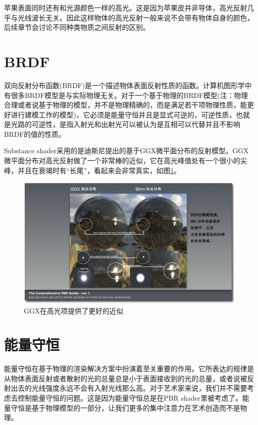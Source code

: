 苹果表面同时还有和光源颜色一样的高光。这是因为苹果皮并非导体，高光反射几乎与光线波长无关。因此这样物体的高光反射一般来说不会带有物体自身的颜色，后续章节会讨论不同种类物质之间反射的区别。

\section{BRDF}

双向反射分布函数(BRDF)是一个描述物体表面反射性质的函数。计算机图形学中有很多BRDF模型是与实际物理无关。对于一个基于物理的BRDF模型(注：物理合理或者说基于物理的模型，并不是物理精确的，而是满足若干项物理性质，能更好进行建模工作的模型)，它必须是能量守恒并且是显式可逆的，可逆性质，也就是光路的可逆性，是指入射光和出射光可以被认为是互相可以代替并且不影响BRDF的值的性质。

Substance shader采用的是迪斯尼提出的基于GGX微平面分布的反射模型。GGX微平面分布对高光反射做了一个非常棒的近似，它在高光峰值处有一个很小的尖峰，并且在衰竭时有“长尾”，看起来会非常真实，如图\ref{fig:chap1_8}。

\begin{figure}[ht]
    \centering
	\includegraphics[width=\textwidth]{images/chap1_8.jpg}
	\caption{GGX在高光项提供了更好的近似}
    \label{fig:chap1_8}
\end{figure}

\section{能量守恒}

能量守恒在基于物理的渲染解决方案中扮演着至关重要的作用。它所表达的规律是从物体表面反射或者散射的光的总量总是小于表面接收到的光的总量，或者说被反射出去的光线强度永远不会有入射光线那么高。对于艺术家来说，我们并不需要考虑去控制能量守恒的问题。这是因为能量守恒总是在PBR shader里被考虑了。能量守恒是基于物理模型的一部分，让我们更多的集中注意力在艺术创造而不是物理。

